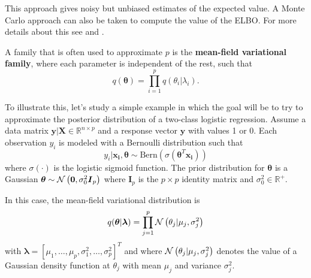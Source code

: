 This approach gives noisy but unbiased estimates of the expected value. A Monte Carlo approach can also be taken to compute the value of the ELBO. For more details about this see \cite{kucukelbir2017automatic} and \cite{ranganath2014black}.

A family that is often used to approximate $p$ is the \textbf{mean-field variational family}, where each parameter is independent of the rest, such that
\begin{equation}
  q(\boldsymbol{\theta}) = \prod_{i = 1}^p q(\theta_i | \lambda_i).
\end{equation}

To illustrate this, let's study a simple example in which the goal will be to try to approximate the posterior distribution of a two-class logistic regression. Assume a data matrix $\boldsymbol{y} | \boldsymbol{X} \in \mathbb{R}^{n \times p}$ and a response vector $\boldsymbol{y}$ with values 1 or 0. Each observation $y_i$ is modeled with a Bernoulli distribution such that
\begin{equation}
  y_i | \boldsymbol{x_i}, \boldsymbol{\theta} \sim \mathrm{Bern}(\sigma(\boldsymbol{\theta}^T \boldsymbol{x_i}))
\end{equation}
where $\sigma(\cdot)$ is the logistic sigmoid function. The prior distribution for $\boldsymbol{\theta}$ is a Gaussian $\boldsymbol{\theta} \sim \mathcal{N}\left( \boldsymbol{0}, \sigma_0^2 \boldsymbol{I}_p \right)$ where $\boldsymbol{I}_p$ is the $p \times p$ identity matrix and $\sigma_0^2 \in \mathbb{R}^+$.

In this case, the mean-field variational distribution is
\begin{equation}
  \label{eq:mean_field_normal_prior}
  q(\boldsymbol{\theta} | \boldsymbol{\lambda}) = \prod_{j = 1}^p \mathcal{N}\left( \theta_j | \mu_j, \sigma_j^2 \right)
 \end{equation}
with $\boldsymbol{\lambda} = \left[ \mu_1, \hdots, \mu_p, \sigma_1^2, \hdots, \sigma_p^2 \right]^T$ and where $\mathcal{N}\left( \theta_j | \mu_j, \sigma_j^2 \right)$ denotes the value of a Gaussian density function at $\theta_j$ with mean $\mu_j$ and variance $\sigma_j^2$.

